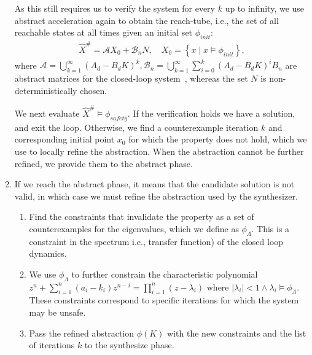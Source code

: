 \documentclass[twocolumn]{autart}    %
\begin{document}
\begin{enumerate}
%
As this still requires us to verify the system for every $k$ up to infinity,
we use abstract acceleration again to obtain the reach-tube, i.e., the set
of all reachable states at all times given an initial set
$\phi_\mathit{init}$:
%
\begin{align}
\label{eq:aa_observer_LTI_cf}
\hat{X}^\#
=\mathcal{A} X_0 + \mathcal{B}_{n} N, \quad
X_0 =\left \{x \mid x \models \phi_\mathit{init} \right\}, 
\end{align}
%
where $\mathcal{A}=\bigcup_{k=1}^\infty (A_d-B_dK)^k,
\mathcal{B}_{n}=\bigcup_{k=1}^\infty \sum_{i=0}^k(A_d-B_dK)^iB_{n}$ are
abstract matrices for the closed-loop system~\cite{cattaruzza2015unbounded},
whereas the set $N$ is non-deterministically chosen.

We next evaluate $\hat{X}^\# \models \phi_\mathit{safety}$.  If the
verification holds we have a solution, and exit the loop.  Otherwise, we
find a counterexample iteration $k$ and corresponding initial point $x_0$
for which the property does not hold, which we use to locally refine the
abstraction.  When the abstraction cannot be further refined, we provide
them to the {\sc abstract} phase.
%
\item If we reach the {\sc abstract} phase, it means that the candidate solution is not valid,
  in which case we must refine the abstraction used by the synthesizer.
\begin{enumerate}
\item Find the constraints that invalidate the property
 as a set of counterexamples for the eigenvalues, which we define as $\phi_\Lambda$. This is a constraint in the spectrum i.e., transfer function) of the closed loop dynamics. 
\item We use $\phi_\Lambda$ to
  further constrain the characteristic polynomial %
$z^n+\sum_{i=1}^n(a_i-k_i)z^{n-i}=\prod_{i=1}^n (z-\lambda_i) \text{ where } |\lambda_i|<1 \wedge \lambda_i \models \phi_{\Lambda}$. These constraints correspond to specific iterations for which the system may be unsafe.
\item Pass the refined abstraction $\phi(K)$ with the new constraints and the list of iterations $k$ to the {\sc synthesize} phase.
\end{enumerate} 
\end{enumerate}
\end{document}
